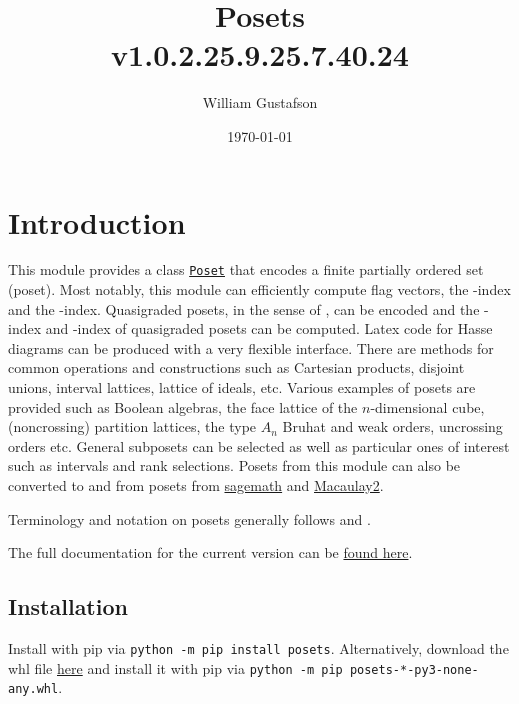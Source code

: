 \documentclass[12pt]{article}
\begin{document}
\title{Posets\\\large v1.0.2.25.9.25.7.40.24}\author{William Gustafson}
\date{\today}
\maketitle
\tableofcontents
\setlength{\parskip}{\baselineskip}


{\list{}{\leftmargin 0.5cm}\item{
\section{Introduction}

This module provides a class \hyperlink{Poset}{\texttt{Poset}} that encodes a finite
partially ordered set (poset). Most notably, this module can efficiently
compute flag vectors, the \av\bv-index and the \cv\dv-index.
Quasigraded posets, in the sense of \cite{ehrenborg-goresky-readdy-15}, can be encoded and the \av\bv-index and \cv\dv-index of quasigraded
posets can be computed. Latex code
for Hasse diagrams can be produced with a very flexible interface.
There are
methods for common operations and constructions such as Cartesian products,
disjoint unions, interval lattices, lattice of ideals, etc. Various examples
of posets are provided such as Boolean algebras, the face lattice of the
$n$-dimensional cube, (noncrossing) partition lattices, the type $A_n$ Bruhat
and weak orders, uncrossing orders etc. General subposets can be
selected as well as particular ones of interest such as intervals and
rank selections. Posets from this
module can also be converted to and from posets from \href{https://www.sagemath.org}{sagemath} and \href{https://www.macaulay2.com/}{Macaulay2}.

Terminology and notation on posets generally follows \cite{stanley-12} and \cite{birkhoff-67}.

The full documentation for the current version can be \href{https://www.github.com/williamGustafson/posets/releases/latest/download/posets.pdf}{found here}.

\subsection{Installation}

Install with pip via \verb|python -m pip install posets|.
Alternatively, download the whl file \href{https://www.github.com/WilliamGustafson/posets/releases}{here} and install it with pip via \verb|python -m pip posets-*-py3-none-any.whl|.

}}
\end{document}
